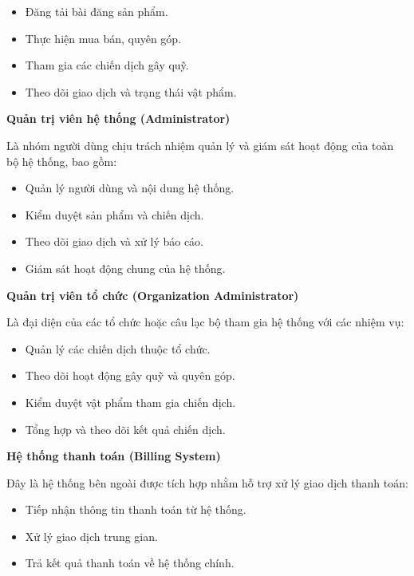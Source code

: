 \documentclass[12pt,a4paper]{report}
\begin{document}
\begin{itemize}[label=--, leftmargin=1.2cm]
\item Đăng tải bài đăng sản phẩm.
\item Thực hiện mua bán, quyên góp.
\item Tham gia các chiến dịch gây quỹ.
\item Theo dõi giao dịch và trạng thái vật phẩm.
\end{itemize}

\textbf{Quản trị viên hệ thống (Administrator)}

Là nhóm người dùng chịu trách nhiệm quản lý và giám sát hoạt động của toàn bộ hệ thống, bao gồm:

\begin{itemize}[label=--, leftmargin=1.2cm]
\item Quản lý người dùng và nội dung hệ thống.
\item Kiểm duyệt sản phẩm và chiến dịch.
\item Theo dõi giao dịch và xử lý báo cáo.
\item Giám sát hoạt động chung của hệ thống.
\end{itemize}

\textbf{Quản trị viên tổ chức (Organization Administrator)}

Là đại diện của các tổ chức hoặc câu lạc bộ tham gia hệ thống với các nhiệm vụ:

\begin{itemize}[label=--, leftmargin=1.2cm]
\item Quản lý các chiến dịch thuộc tổ chức.
\item Theo dõi hoạt động gây quỹ và quyên góp.
\item Kiểm duyệt vật phẩm tham gia chiến dịch.
\item Tổng hợp và theo dõi kết quả chiến dịch.
\end{itemize}

\textbf{Hệ thống thanh toán (Billing System)}

Đây là hệ thống bên ngoài được tích hợp nhằm hỗ trợ xử lý giao dịch thanh toán:

\begin{itemize}[label=--, leftmargin=1.2cm]
\item Tiếp nhận thông tin thanh toán từ hệ thống.
\item Xử lý giao dịch trung gian.
\item Trả kết quả thanh toán về hệ thống chính.
\end{itemize}
\end{document}
